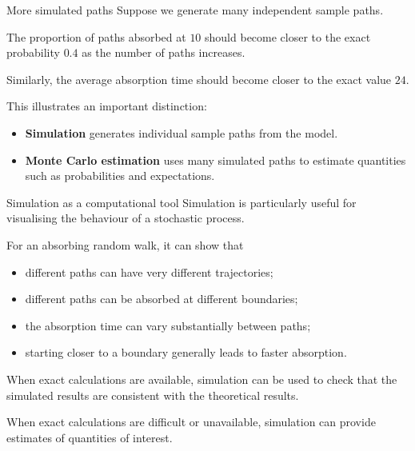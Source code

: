 \documentclass[
  ignorenonframetext,
  aspectratio=169,
]{beamer}
\providecommand{\tightlist}{%
  \setlength{\itemsep}{0pt}\setlength{\parskip}{0pt}}
\begin{document}
\begin{frame}{More simulated paths}
\protect{}\label{more-simulated-paths}
Suppose we generate many independent sample paths.

The proportion of paths absorbed at \(10\) should become closer to the
exact probability \(0.4\) as the number of paths increases.

Similarly, the average absorption time should become closer to the exact
value \(24\).

This illustrates an important distinction:

\begin{itemize}
\tightlist
\item
  \textbf{Simulation} generates individual sample paths from the model.
\item
  \textbf{Monte Carlo estimation} uses many simulated paths to estimate
  quantities such as probabilities and expectations.
\end{itemize}
\end{frame}

\begin{frame}{Simulation as a computational tool}
\protect{}\label{simulation-as-a-computational-tool}
Simulation is particularly useful for visualising the behaviour of a
stochastic process.

For an absorbing random walk, it can show that

\begin{itemize}
\tightlist
\item
  different paths can have very different trajectories;
\item
  different paths can be absorbed at different boundaries;
\item
  the absorption time can vary substantially between paths;
\item
  starting closer to a boundary generally leads to faster absorption.
\end{itemize}

When exact calculations are available, simulation can be used to check
that the simulated results are consistent with the theoretical results.

When exact calculations are difficult or unavailable, simulation can
provide estimates of quantities of interest.
\end{frame}

\begin{frame}
\end{frame}
\end{document}
